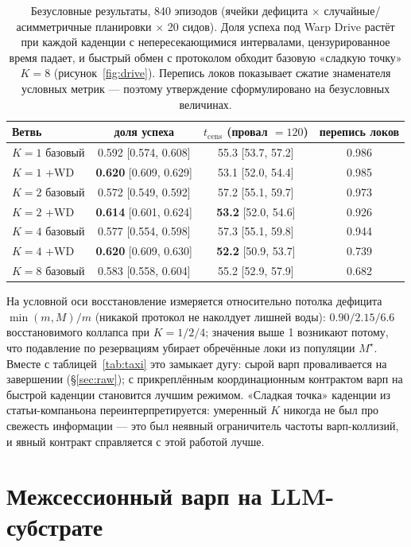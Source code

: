 \documentclass{article}
\newcommand{\mstar}{M^{\star}}
\begin{document}
\begin{table}[h]
\centering
\caption{Безусловные результаты, 840 эпизодов (ячейки дефицита
$\times$ случайные/асимметричные планировки $\times$ 20 сидов). Доля
успеха под Warp Drive растёт при каждой каденции с непересекающимися
интервалами, цензурированное время падает, и быстрый обмен с
протоколом обходит базовую «сладкую точку» $K{=}8$
(рисунок~\ref{fig:drive}). Перепись локов показывает сжатие
знаменателя условных метрик --- поэтому утверждение сформулировано на
безусловных величинах.}
\label{tab:wd}
\small
\begin{tabular}{lccc}
\toprule
Ветвь & доля успеха & $t_{\text{cens}}$ (провал $=120$) & перепись локов \\
\midrule
$K{=}1$ базовый & 0.592 [0.574, 0.608] & 55.3 [53.7, 57.2] & 0.986 \\
$K{=}1$ +WD  & \textbf{0.620} [0.609, 0.629] & 53.1 [52.0, 54.4] & 0.985 \\
$K{=}2$ базовый & 0.572 [0.549, 0.592] & 57.2 [55.1, 59.7] & 0.973 \\
$K{=}2$ +WD  & \textbf{0.614} [0.601, 0.624] & \textbf{53.2} [52.0, 54.6] & 0.926 \\
$K{=}4$ базовый & 0.577 [0.554, 0.598] & 57.3 [55.1, 59.8] & 0.944 \\
$K{=}4$ +WD  & \textbf{0.620} [0.609, 0.630] & \textbf{52.2} [50.9, 53.7] & 0.739 \\
$K{=}8$ базовый & 0.583 [0.558, 0.604] & 55.2 [52.9, 57.9] & 0.682 \\
\bottomrule
\end{tabular}
\end{table}

На условной оси восстановление измеряется относительно потолка
дефицита $\min(m,M)/m$ (никакой протокол не наколдует лишней воды):
$0.90 / 2.15 / 6.6$ восстановимого коллапса при $K{=}1/2/4$; значения
выше 1 возникают потому, что подавление по резервациям убирает
обречённые локи из популяции $\mstar$. Вместе с
таблицей~\ref{tab:taxi} это замыкает дугу: сырой варп проваливается
на завершении (\S\ref{sec:raw}); с прикреплённым координационным
контрактом варп на быстрой каденции становится лучшим режимом.
«Сладкая точка» каденции из статьи-компаньона переинтерпретируется:
умеренный $K$ никогда не был про свежесть информации --- это был
неявный ограничитель частоты варп-коллизий, и явный контракт
справляется с этой работой лучше.

\section{Межсессионный варп на LLM-субстрате}
\label{sec:llm}
\end{document}
